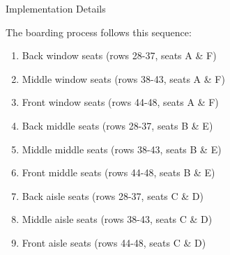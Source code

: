 \documentclass{article}
\begin{document}
\begin{center}
  \Large Implementation Details
\end{center}

The boarding process follows this sequence:
\begin{enumerate}
  \item Back window seats (rows 28-37, seats A \& F)
  \item Middle window seats (rows 38-43, seats A \& F)
  \item Front window seats (rows 44-48, seats A \& F)
  \item Back middle seats (rows 28-37, seats B \& E)
  \item Middle middle seats (rows 38-43, seats B \& E)
  \item Front middle seats (rows 44-48, seats B \& E)
  \item Back aisle seats (rows 28-37, seats C \& D)
  \item Middle aisle seats (rows 38-43, seats C \& D)
  \item Front aisle seats (rows 44-48, seats C \& D)
\end{enumerate}
\end{document}
